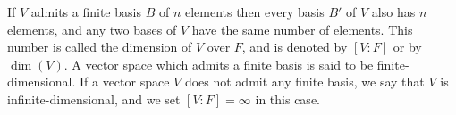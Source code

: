 If $V$ admits a finite basis $B$ of $n$ elements then every basis $B'$ of $V$ also has $n$ elements, and any two bases of $V$ have the same number of elements. This number is called the dimension of $V$ over $F$, and is denoted by $[V:F]$ or by $\dim(V)$. A vector space which admits a finite basis is said to be finite-dimensional. If a vector space $V$ does not admit any finite basis, we say that $V$ is infinite-dimensional, and we set $[V:F] = \infty$ in this case.
